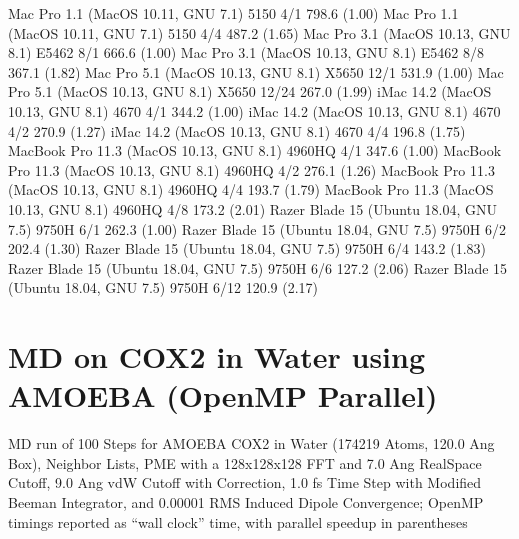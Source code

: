 \documentclass[letterpaper,11pt,english]{sphinxmanual}
\begin{document}

\begin{sphinxVerbatim}[commandchars=\\\{\}]
Mac Pro 1.1 (MacOS 10.11, GNU 7.1)             5150           4/1        798.6 (1.00)
Mac Pro 1.1 (MacOS 10.11, GNU 7.1)             5150           4/4        487.2 (1.65)
Mac Pro 3.1 (MacOS 10.13, GNU 8.1)            E5462           8/1        666.6 (1.00)
Mac Pro 3.1 (MacOS 10.13, GNU 8.1)            E5462           8/8        367.1 (1.82)
Mac Pro 5.1 (MacOS 10.13, GNU 8.1)            X5650          12/1        531.9 (1.00)
Mac Pro 5.1 (MacOS 10.13, GNU 8.1)            X5650         12/24        267.0 (1.99)
iMac 14.2 (MacOS 10.13, GNU 8.1)               4670           4/1        344.2 (1.00)
iMac 14.2 (MacOS 10.13, GNU 8.1)               4670           4/2        270.9 (1.27)
iMac 14.2 (MacOS 10.13, GNU 8.1)               4670           4/4        196.8 (1.75)
MacBook Pro 11.3 (MacOS 10.13, GNU 8.1)      4960HQ           4/1        347.6 (1.00)
MacBook Pro 11.3 (MacOS 10.13, GNU 8.1)      4960HQ           4/2        276.1 (1.26)
MacBook Pro 11.3 (MacOS 10.13, GNU 8.1)      4960HQ           4/4        193.7 (1.79)
MacBook Pro 11.3 (MacOS 10.13, GNU 8.1)      4960HQ           4/8        173.2 (2.01)
Razer Blade 15 (Ubuntu 18.04, GNU 7.5)        9750H           6/1        262.3 (1.00)
Razer Blade 15 (Ubuntu 18.04, GNU 7.5)        9750H           6/2        202.4 (1.30)
Razer Blade 15 (Ubuntu 18.04, GNU 7.5)        9750H           6/4        143.2 (1.83)
Razer Blade 15 (Ubuntu 18.04, GNU 7.5)        9750H           6/6        127.2 (2.06)
Razer Blade 15 (Ubuntu 18.04, GNU 7.5)        9750H          6/12        120.9 (2.17)
\end{sphinxVerbatim}


\section{MD on COX\sphinxhyphen{}2 in Water using AMOEBA (OpenMP Parallel)}
\label{\detokenize{text/benchmarks:md-on-cox-2-in-water-using-amoeba-openmp-parallel}}
MD run of 100 Steps for AMOEBA COX\sphinxhyphen{}2 in Water (174219 Atoms, 120.0 Ang Box), Neighbor Lists, PME with a 128x128x128 FFT and 7.0 Ang Real\sphinxhyphen{}Space Cutoff, 9.0 Ang vdW Cutoff with Correction, 1.0 fs Time Step with Modified Beeman Integrator, and 0.00001 RMS Induced Dipole Convergence; OpenMP timings reported as “wall clock” time, with parallel speedup in parentheses
\end{document}
